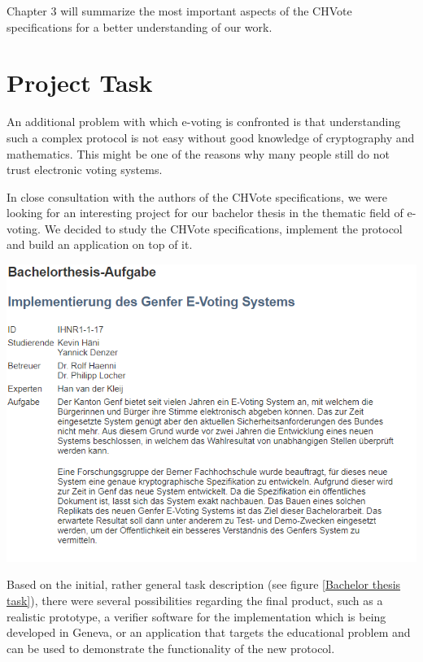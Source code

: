 Chapter 3 will summarize the most important aspects of the CHVote specifications for a better understanding of our work.

\section{Project Task}
An additional problem with which e-voting is confronted is that understanding such a complex protocol is not easy without good knowledge of cryptography and mathematics. This might be one of the reasons why many people still do not trust electronic voting systems.

In close consultation with the authors of the CHVote specifications, we were looking for an interesting project for our bachelor thesis in the thematic field of e-voting. We decided to study the CHVote specifications, implement the protocol and build an application on top of it.

\begin{center}
\includegraphics[scale=0.95]{assets/aufgabe.PNG}
\label{Bachelor thesis task}%
\end{center}

Based on the initial, rather general task description (see figure \ref{Bachelor thesis task}), there were several possibilities regarding the final product, such as a realistic prototype, a verifier software for the implementation which is being developed in Geneva, or an application that targets the educational problem and can be used to demonstrate the functionality of the new protocol.

